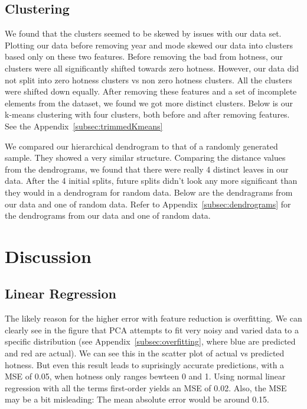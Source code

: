 \documentclass[12pt]{article}
\begin{document}
\subsection{Clustering}
\label{subsec:clusteringResults}
We found that the clusters seemed to be skewed by issues with our data set. Plotting our data before removing year and mode skewed our data into clusters based only on these two features. Before removing the bad from hotness, our clusters were all significantly shifted towards zero hotness. However, our data did not split into zero hotness clusters vs non zero hotness clusters. All the clusters were shifted down equally. After removing these features and a set of incomplete elements from the dataset, we found we got more distinct clusters. Below is our k-means clustering with four clusters, both before and after removing features.
See the Appendix~\ref{subsec:trimmedKmeans}


We compared our hierarchical dendrogram to that of a randomly generated sample. They showed a very similar structure. Comparing the distance values from the dendrograms, we found that there were really 4 distinct leaves in our data. After the 4 initial splits, future splits didn't look any more significant than they would in a dendrogram for random data. Below are the dendragrams from our data and one of random data.
Refer to Appendix~\ref{subsec:dendrograms} for the dendrograms from our data and one of random data.
\section{Discussion}
\label{sec:discussion}
\subsection{Linear Regression}
\label{subsec:linearRegressionDisc}
The likely reason for the higher error with feature reduction is overfitting. We can clearly see in the figure that PCA attempts to fit very noisy and varied data to a specific distribution (see Appendix~\ref{subsec:overfitting}, where blue are predicted and red are actual). We can see this in the scatter plot of actual vs predicted hotness. But even this result leads to suprisingly accurate predictions, with a MSE of 0.05, when hotness only ranges bewteen 0 and 1. Using normal linear regression with all the terms first-order yields an MSE of 0.02.  Also, the MSE may be a bit misleading: The mean absolute error would be around 0.15. 
\end{document}
